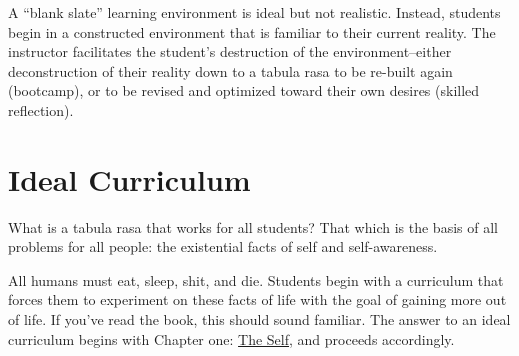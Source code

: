 \documentclass[
]{book}
\begin{document}
A ``blank slate'' learning environment is ideal but not realistic. Instead, students begin in a constructed environment that is familiar to their current reality. The instructor facilitates the student's destruction of the environment--either deconstruction of their reality down to a tabula rasa to be re-built again (bootcamp), or to be revised and optimized toward their own desires (skilled reflection).

\section{Ideal Curriculum}\label{ideal-curriculum}

What is a tabula rasa that works for all students? That which is the basis of all problems for all people: the existential facts of self and self-awareness.

All humans must eat, sleep, shit, and die. Students begin with a curriculum that forces them to experiment on these facts of life with the goal of gaining more out of life. If you've read the book, this should sound familiar. The answer to an ideal curriculum begins with Chapter one: \hyperref[self]{The Self}, and proceeds accordingly.

  
\end{document}
